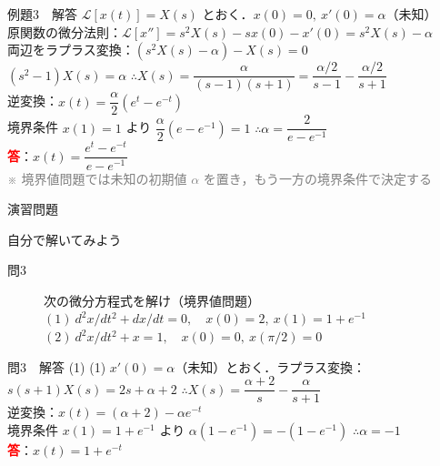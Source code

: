 \documentclass[professionalfonts]{beamer}
\begin{document}
\begin{frame}{例題3　解答}
  $\mathcal{L}[x(t)] = X(s)$ とおく．$x(0)=0,\ x'(0)=\alpha$（未知）\\[4pt]
  原関数の微分法則：$\mathcal{L}[x''] = s^{2}X(s) - sx(0) - x'(0) = s^{2}X(s) - \alpha$\\[4pt]
  両辺をラプラス変換：$(s^{2}X(s)-\alpha) - X(s) = 0$\\[4pt]
  $(s^{2}-1)X(s) = \alpha$ \quad $\therefore X(s) = \dfrac{\alpha}{(s-1)(s+1)} = \dfrac{\alpha/2}{s-1} - \dfrac{\alpha/2}{s+1}$\\[4pt]
  逆変換：$x(t) = \dfrac{\alpha}{2}(e^{t} - e^{-t})$\\[4pt]
  境界条件 $x(1) = 1$ より $\dfrac{\alpha}{2}(e - e^{-1}) = 1$ \quad $\therefore \alpha = \dfrac{2}{e - e^{-1}}$
  \\[8pt]\textcolor{red}{\textbf{答}}：$x(t) = \dfrac{e^{t} - e^{-t}}{e - e^{-1}}$\\[4pt]
  {\footnotesize \textcolor{gray}{※ 境界値問題では未知の初期値 $\alpha$ を置き，もう一方の境界条件で決定する}}
\end{frame}

\begin{frame}{演習問題}
  \begin{exampleblock}{自分で解いてみよう}
  \begin{description}
    \item[問3] 次の微分方程式を解け（境界値問題）
    $(1)\ d^{2}x/dt^{2} + dx/dt = 0,\quad x(0)=2,\ x(1)=1+e^{-1}$\\
    $(2)\ d^{2}x/dt^{2} + x = 1,\quad x(0)=0,\ x(\pi/2)=0$\\
  \end{description}
  \end{exampleblock}
\end{frame}

\begin{frame}{問3　解答 (1)}
  (1) $x'(0)=\alpha$（未知）とおく．ラプラス変換：\\[4pt]
  $s(s+1)X(s) = 2s+\alpha+2$ \quad $\therefore X(s) = \dfrac{\alpha+2}{s} - \dfrac{\alpha}{s+1}$\\[4pt]
  逆変換：$x(t) = (\alpha+2) - \alpha e^{-t}$\\[4pt]
  境界条件 $x(1)=1+e^{-1}$ より $\alpha(1-e^{-1}) = -(1-e^{-1})$ \quad $\therefore \alpha=-1$
  \\[8pt]\textcolor{red}{\textbf{答}}：$x(t) = 1 + e^{-t}$
\end{frame}
\end{document}
